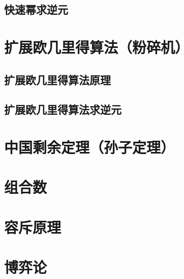 \documentclass[]{book}
\begin{document}
\section{快速幂求逆元}

\chapter{扩展欧几里得算法（粉碎机）}
\section{扩展欧几里得算法原理}
\section{扩展欧几里得算法求逆元}

\chapter{中国剩余定理（孙子定理）}

\chapter{组合数}

\chapter{容斥原理}

\chapter{博弈论}
\end{document}
